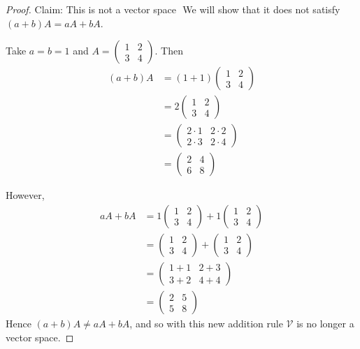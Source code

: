 \documentclass{article}
\begin{document}
\begin{proof} Claim: This is not a vector space
$ $ \newline
We will show that it does not satisfy $(a+b)A = aA+bA$.

Take $a=b=1$ and $A= \begin{pmatrix} 1 & 2 \\ 3 & 4 \end{pmatrix}$. Then
\begin{align*}
(a+b)A &= (1+1)\begin{pmatrix} 1 & 2 \\ 3 & 4 \end{pmatrix}\\
&= 2 \begin{pmatrix} 1 & 2 \\ 3 & 4 \end{pmatrix} \\
&=\begin{pmatrix} 2\cdot 1 & 2\cdot 2 \\2\cdot  3 & 2\cdot 4 \end{pmatrix}\\
&= \begin{pmatrix} 2 & 4 \\ 6 & 8 \end{pmatrix}
\end{align*}

However,
\begin{align*}
aA+bA &= 1\begin{pmatrix} 1 & 2 \\ 3 & 4 \end{pmatrix} + 1\begin{pmatrix} 1 & 2 \\ 3 & 4 \end{pmatrix} \\
&= \begin{pmatrix} 1 & 2 \\ 3 & 4 \end{pmatrix} +\begin{pmatrix} 1 & 2 \\ 3 & 4 \end{pmatrix} \\
&= \begin{pmatrix} 1+1 & 2+3 \\ 3+2 & 4+4 \end{pmatrix} \\
&= \begin{pmatrix} 2 & 5 \\ 5 & 8 \end{pmatrix}
\end{align*}
Hence $(a+b)A \ne aA+bA$, and so with this new addition rule $\mathcal{V}$ is no longer a vector space.

\end{proof}
\end{document}
